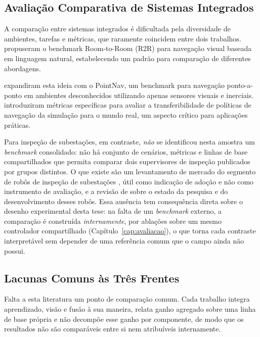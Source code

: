 \subsection{Avaliação Comparativa de Sistemas Integrados}

A comparação entre sistemas integrados é dificultada pela diversidade de ambientes, tarefas e métricas, que raramente coincidem entre dois trabalhos.  propuseram o benchmark Room-to-Room (R2R) para navegação visual baseada em linguagem natural, estabelecendo um padrão para comparação de diferentes abordagens.

 expandiram esta ideia com o PointNav, um benchmark para navegação ponto-a-ponto em ambientes desconhecidos utilizando apenas sensores visuais e inerciais.  introduziram métricas específicas para avaliar a transferibilidade de políticas de navegação da simulação para o mundo real, um aspecto crítico para aplicações práticas.

Para inspeção de subestações, em contraste, \emph{não} se identificou nesta amostra um
\textit{benchmark} consolidado: não há conjunto de cenários, métricas e linhas de base
compartilhados que permita comparar dois supervisores de inspeção publicados por grupos
distintos. O que existe são um levantamento de mercado do segmento de robôs de inspeção
de subestações \cite{GlobalGrowthInsights2024}, útil como indicação de adoção e não
como instrumento de avaliação, e a revisão de  sobre o
estado da pesquisa e do desenvolvimento desses robôs. Essa ausência tem consequência
direta sobre o desenho experimental desta tese: na falta de um \textit{benchmark}
externo, a comparação é construída \emph{internamente}, por ablações sobre um mesmo
controlador compartilhado (Capítulo~\ref{cap:avaliacao}), o que torna cada contraste
interpretável sem depender de uma referência comum que o campo ainda não possui.

\subsection{Lacunas Comuns às Três Frentes}

Falta a esta literatura um ponto de comparação comum. Cada trabalho integra aprendizado, visão e fusão à sua maneira, relata ganho agregado sobre uma linha de base própria e não decompõe esse ganho por componente, de modo que os resultados não são comparáveis entre si nem atribuíveis internamente.

